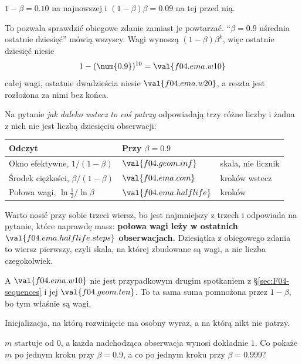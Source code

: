 \begin{fr}
\begin{ansblock}
$1 - \beta = \num{0.10}$ na najnowszej i $(1-\beta)\beta = \num{0.09}$ na tej
przed nią.
\end{ansblock}

To pozwala sprawdzić obiegowe zdanie zamiast je powtarzać.
\enquote{$\beta = \num{0.9}$ uśrednia ostatnie dziesięć} mówią wszyscy. Wagi
wynoszą $(1-\beta)\beta^{k}$, więc ostatnie dziesięć niesie
\[ 1 - (\num{0.9})^{10} = \val{f04.ema.w10} \]
całej wagi, ostatnie dwadzieścia niesie $\val{f04.ema.w20}$, a reszta jest
rozłożona za nimi bez końca.

Na pytanie \emph{jak daleko wstecz to coś patrzy} odpowiadają trzy różne
liczby i żadna z nich nie jest liczbą dziesięciu obserwacji:

\begin{center}
\begin{tabular}{lll}
\toprule
Odczyt & Przy $\beta = \num{0.9}$ & \\
\midrule
Okno efektywne, $1/(1-\beta)$ & $\val{f04.geom.inf}$ & skala, nie licznik \\
Środek ciężkości, $\beta/(1-\beta)$ & $\val{f04.ema.com}$ & kroków wstecz \\
Połowa wagi, $\ln \frac{1}{2} / \ln \beta$ & $\val{f04.ema.halflife}$ & kroków \\
\bottomrule
\end{tabular}
\end{center}

Warto nosić przy sobie trzeci wiersz, bo jest najmniejszy z trzech i
odpowiada na pytanie, które naprawdę masz: \textbf{połowa wagi leży w
ostatnich $\val{f04.ema.halflife.steps}$ obserwacjach.} Dziesiątka z
obiegowego zdania to wiersz pierwszy, czyli skala, na której zbudowane są
wagi, a nie liczba czegokolwiek.

A $\val{f04.ema.w10}$ nie jest przypadkowym drugim spotkaniem z
\S\ref{sec:F04-sequences} i jej $\val{f04.geom.ten}$. To ta sama suma
pomnożona przez $1 - \beta$, bo tym właśnie są wagi.
\end{fr}


\begin{fr}
\yourturn
Inicjalizacja, na którą rozwinięcie ma osobny wyraz, a na którą nikt nie
patrzy.

$m$ startuje od $0$, a każda nadchodząca obserwacja wynosi dokładnie $1$. Co
pokaże $m$ po jednym kroku przy $\beta = \num{0.9}$, a co po jednym kroku przy
$\beta = \num{0.999}$?
\dotline
\nextframe
\end{fr}

